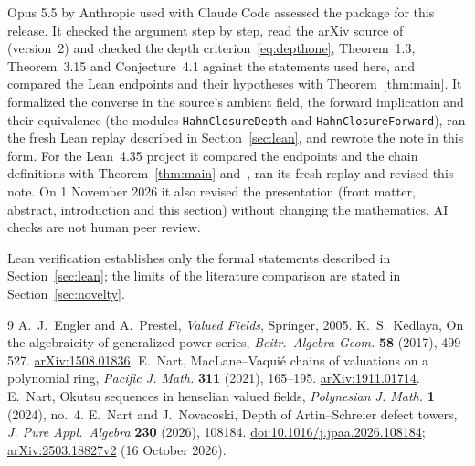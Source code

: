 \documentclass[11pt]{article}
\newcommand{\code}[1]{\nolinkurl{#1}}
\begin{document}
Opus 5.5 by Anthropic used with Claude Code assessed the package for this release. It checked the argument step by step, read the arXiv source of~\cite{NN} (version~2) and checked the depth criterion~\eqref{eq:depthone}, Theorem~1.3, Theorem~3.15 and Conjecture~4.1 against the statements used here, and compared the Lean endpoints and their hypotheses with Theorem~\ref{thm:main}. It formalized the converse in the source's ambient field, the forward implication and their equivalence (the modules \code{HahnClosureDepth} and \code{HahnClosureForward}), ran the fresh Lean replay described in Section~\ref{sec:lean}, and rewrote the note in this form. For the Lean~4.35 project it compared the endpoints and the chain definitions with Theorem~\ref{thm:main} and~\cite{N21}, ran its fresh replay and revised this note. On 1 November 2026 it also revised the presentation (front matter, abstract, introduction and this section) without changing the mathematics. AI checks are not human peer review.

Lean verification establishes only the formal statements described in Section~\ref{sec:lean}; the limits of the literature comparison are stated in Section~\ref{sec:novelty}.

\begin{thebibliography}{9}\small
{} A.~J.~Engler and A.~Prestel, \emph{Valued Fields}, Springer, 2005.
 K.~S.~Kedlaya, On the algebraicity of generalized power series, \emph{Beitr.\ Algebra Geom.} \textbf{58} (2017), 499--527. \href{https://arxiv.org/abs/1508.01836}{arXiv:1508.01836}.
 E.~Nart, MacLane--Vaquié chains of valuations on a polynomial ring, \emph{Pacific J. Math.} \textbf{311} (2021), 165--195. \href{https://arxiv.org/abs/1911.01714}{arXiv:1911.01714}.
 E.~Nart, Okutsu sequences in henselian valued fields, \emph{Polynesian J. Math.} \textbf{1} (2024), no.~4.
 E.~Nart and J.~Novacoski, Depth of Artin--Schreier defect towers, \emph{J. Pure Appl.\ Algebra} \textbf{230} (2026), 108184. \href{https://doi.org/10.1016/j.jpaa.2026.108184}{doi:10.1016/j.jpaa.2026.108184}; \href{https://arxiv.org/abs/2503.18827}{arXiv:2503.18827v2} (16 October 2026).
\end{thebibliography}
\end{document}

